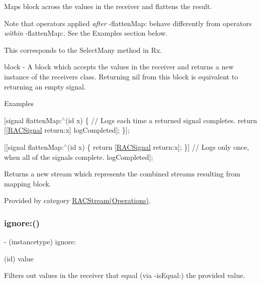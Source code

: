 Maps {\ttfamily block} across the values in the receiver and flattens the result.

Note that operators applied {\itshape after} -\/flatten\+Map\+: behave differently from operators {\itshape within} -\/flatten\+Map\+:. See the Examples section below.

This corresponds to the {\ttfamily Select\+Many} method in Rx.

block -\/ A block which accepts the values in the receiver and returns a new instance of the receiver\textquotesingle{}s class. Returning {\ttfamily nil} from this block is equivalent to returning an empty signal.

Examples

\mbox{[}signal flatten\+Map\+:$^\wedge$(id x) \{ // Logs each time a returned signal completes. return \mbox{[}\mbox{[}\mbox{\hyperlink{interface_r_a_c_signal}{R\+A\+C\+Signal}} return\+:x\mbox{]} log\+Completed\mbox{]}; \}\mbox{]};

\mbox{[}\mbox{[}signal flatten\+Map\+:$^\wedge$(id x) \{ return \mbox{[}\mbox{\hyperlink{interface_r_a_c_signal}{R\+A\+C\+Signal}} return\+:x\mbox{]}; \}\mbox{]} // Logs only once, when all of the signals complete. log\+Completed\mbox{]};

Returns a new stream which represents the combined streams resulting from mapping {\ttfamily block}. 

Provided by category \mbox{\hyperlink{category_r_a_c_stream_07_operations_08_a2441b0306adc6ae2845219f8b116119a}{R\+A\+C\+Stream(\+Operations)}}.

\mbox{\label{interface_r_a_c_stream_aa0bf73c86006176e745390ee2b3645b2}} 
\subsubsection{\texorpdfstring{ignore\+:()}{ignore:()}\hspace{0.1cm}{\footnotesize\ttfamily [1/3]}}
{\footnotesize\ttfamily -\/ (instancetype) ignore\+: \begin{DoxyParamCaption}\item[{(id)}]{value }\end{DoxyParamCaption}}

Filters out values in the receiver that equal (via -\/is\+Equal\+:) the provided value.


